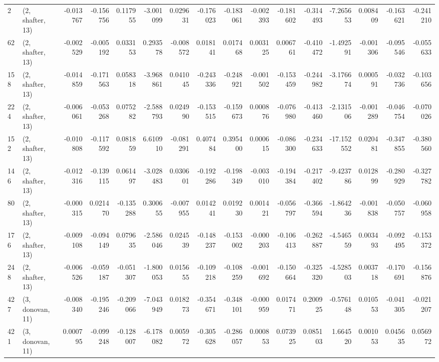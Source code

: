 \begin{tabular}{llrrrrrrrrrrrrrr}
2   &  (2, shafter, 13) &  -0.013767 & -0.156756 &  0.117955 &   -3.001099 &  0.029631 &  -0.176023 & -0.183061 & -0.002393 & -0.181602 & -0.314493 &   -7.265653 &  0.008409 & -0.163621 & -0.241210 \\
62  &  (2, shafter, 13) &  -0.002529 & -0.005192 &  0.033153 &    0.293578 & -0.008572 &   0.018141 &  0.017468 &  0.003125 &  0.006761 & -0.410472 &   -1.492591 & -0.001306 & -0.095546 & -0.055633 \\
158 &  (2, shafter, 13) &  -0.014859 & -0.171563 &  0.058318 &   -3.968861 &  0.041045 &  -0.243336 & -0.248921 & -0.001502 & -0.153459 & -0.244982 &   -3.176674 &  0.000591 & -0.032736 & -0.103656 \\
224 &  (2, shafter, 13) &  -0.006061 & -0.053268 &  0.075282 &   -2.588793 &  0.024990 &  -0.153515 & -0.159673 &  0.000876 & -0.076980 & -0.413460 &   -2.131506 & -0.001289 & -0.046754 & -0.070026 \\
152 &  (2, shafter, 13) &  -0.010808 & -0.117592 &  0.081859 &    6.610910 & -0.081291 &   0.407484 &  0.395400 &  0.000615 & -0.086300 & -0.234633 &  -17.152552 &  0.020481 & -0.347855 & -0.380560 \\
146 &  (2, shafter, 13) &  -0.012316 & -0.139115 &  0.061497 &   -3.028483 &  0.030601 &  -0.192286 & -0.198349 & -0.003010 & -0.194384 & -0.217402 &   -9.423786 &  0.012899 & -0.280929 & -0.327782 \\
80  &  (2, shafter, 13) &  -0.000315 &  0.021470 & -0.135288 &    0.300655 & -0.007955 &   0.014241 &  0.019230 &  0.001421 & -0.056797 & -0.366594 &   -1.864236 & -0.001838 & -0.050757 & -0.060958 \\
176 &  (2, shafter, 13) &  -0.009108 & -0.094149 &  0.079635 &   -2.586046 &  0.024539 &  -0.148237 & -0.153002 & -0.000203 & -0.106413 & -0.262887 &   -4.546559 &  0.003493 & -0.092495 & -0.153372 \\
248 &  (2, shafter, 13) &  -0.006526 & -0.059187 & -0.051307 &   -1.800053 &  0.015655 &  -0.109218 & -0.108259 & -0.001692 & -0.150664 & -0.325320 &   -4.528503 &  0.003718 & -0.170691 & -0.156876 \\
427 &  (3, donovan, 11) &  -0.008340 & -0.195246 & -0.209066 &   -7.043949 &  0.018273 &  -0.354671 & -0.348101 & -0.000959 &  0.017471 &  0.200925 &   -0.576148 &  0.010553 & -0.041305 & -0.021207 \\
421 &  (3, donovan, 11) &   0.000795 & -0.099248 & -0.128007 &   -6.178082 &  0.005972 &  -0.305628 & -0.286057 &  0.000853 &  0.073925 &  0.085103 &    1.664520 &  0.001053 &  0.045635 &  0.056972 \\

\end{tabular}
